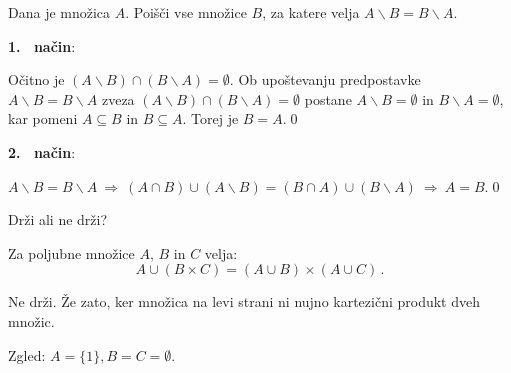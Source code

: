 \documentclass[11pt,paper=b5,footinclude,headinclude]{scrbook} %
\def\sledi {{~\Rightarrow~}}
\newtheorem{ex}{Vaja\hypertarget{sol:\theex}}[chapter]
\begin{document}
\begin{ex}
Dana je množica $A$. Poišči vse množice $B$, za katere velja
$A\backslash B = B\backslash A$.
\end{ex}

\begin{sol}    
\textbf{1.~ način}:

Očitno je
$(A\backslash B) \cap (B\backslash A)=\emptyset$.
Ob upoštevanju predpostavke $A\backslash B = B\backslash A$
zveza
$(A\backslash B) \cap (B\backslash A)=\emptyset$
postane
$A\backslash B =\emptyset$
in $B\backslash A =\emptyset$, kar pomeni
$A\subseteq B$ in $B\subseteq A$. Torej je $B = A$.\qed

\textbf{2.~ način}:

$A\backslash B = B\backslash A \sledi(A\cap B)\cup (A\backslash B) = (B\cap A)\cup (B\backslash A) \sledi A = B$.\qed
\end{sol}

\begin{ex}
Drži ali ne drži?

Za poljubne množice $A$, $B$ in $C$ velja:
$$A\cup (B\times C) = (A\cup B)\times (A\cup C)\,.$$
\end{ex}
\begin{sol}
Ne drži. Že zato, ker množica na levi strani ni nujno kartezični produkt dveh množic.

Zgled: $A = \{1\}, B = C = \emptyset$.

\end{sol}
\end{document}

